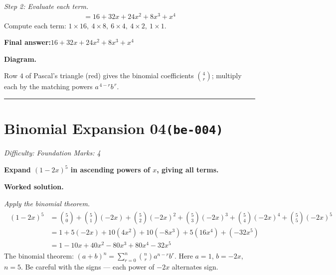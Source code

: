 \documentclass[11pt]{article}
\newcommand{\question}[1]{\par\medskip\noindent\textbf{#1}\par}
\begin{document}
\textit{Step 2: Evaluate each term.}
\[\begin{gathered}
= 16 + 32x + 24x^2 + 8x^3 + x^4
\end{gathered}\]
Compute each term: \(1 \times 16,\ 4 \times 8,\ 6 \times 4,\ 4 \times 2,\ 1 \times 1\).

\begin{answerbox}
\textbf{Final answer:}\quad \(\displaystyle 16 + 32x + 24x^2 + 8x^3 + x^4\)
\end{answerbox}
\textbf{Diagram.}

\begin{center}
\end{center}
\small Row $4$ of Pascal's triangle (red) gives the binomial coefficients $\binom{4}{r}$; multiply each by the matching powers $a^{\,4-r}b^{\,r}$.\normalsize

\medskip\hrule

\section*{Binomial Expansion 04\quad\small\texttt{(be-004)}}
\textit{Difficulty: Foundation \quad\textbar\quad Marks: 4}

\question{Expand \( (1 - 2x)^5 \) in ascending powers of \( x \), giving all terms.}

\textbf{Worked solution.}

\textit{Apply the binomial theorem.}
\[\begin{gathered}
\begin{aligned} (1-2x)^5 &= \binom{5}{0} + \binom{5}{1}(-2x) + \binom{5}{2}(-2x)^2 + \binom{5}{3}(-2x)^3 + \binom{5}{4}(-2x)^4 + \binom{5}{5}(-2x)^5 \\ &= 1 + 5(-2x) + 10(4x^2) + 10(-8x^3) + 5(16x^4) + (-32x^5) \\ &= 1 - 10x + 40x^2 - 80x^3 + 80x^4 - 32x^5 \end{aligned}
\end{gathered}\]
The binomial theorem: \((a+b)^n = \sum_{r=0}^{n} \binom{n}{r} a^{n-r} b^r\). Here \(a = 1\), \(b = -2x\), \(n = 5\). Be careful with the signs --- each power of \(-2x\) alternates sign.
\end{document}
